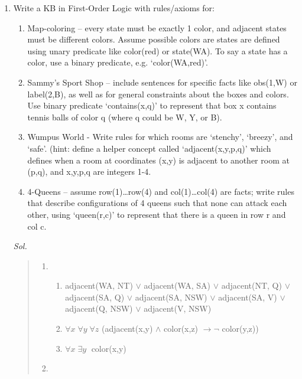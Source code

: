 \documentclass{article}
\theoremstyle{definition}
\newcommand{\<}{\langle}
\renewcommand{\>}{\rangle}
\begin{document}
\begin{enumerate}[label=\textbf{\arabic*.}]
\begin{quote}
\end{quote}
\newpage
\item Write a KB in First-Order Logic with rules/axioms for:
  \begin{enumerate}
    \item Map-coloring – every state must be exactly 1 color, and adjacent states must be different
colors. Assume possible colors are states are defined using unary predicate like color(red)
or state(WA). To say a state has a color, use a binary predicate, e.g. ‘color(WA,red)’.
    \item Sammy’s Sport Shop – include sentences for specific facts like obs(1,W) or label(2,B),
as well as for general constraints about the boxes and colors. Use binary predicate
‘contains(x,q)’ to represent that box x contains tennis balls of color q (where q could be
W, Y, or B).
    \item Wumpus World - Write rules for which rooms are ‘stenchy’, ‘breezy’, and ‘safe’. (hint:
define a helper concept called ‘adjacent(x,y,p,q)’ which defines when a room at
coordinates (x,y) is adjacent to another room at (p,q), and x,y,p,q are integers 1-4.
    \item 4-Queens – assume row(1)…row(4) and col(1)…col(4) are facts; write rules that
describe configurations of 4 queens such that none can attack each other, using
‘queen(r,c)’ to represent that there is a queen in row r and col c.
  \end{enumerate}

  \vspace{1em} 
  \textit{ Sol. }
  \begin{quote}
  \begin{enumerate}
    \item 

      \begin{enumerate}
        \item adjacent(WA, NT) $\lor$ adjacent(WA, SA) $\lor$ adjacent(NT, Q) $\lor$ adjacent(SA, Q) $\lor$ adjacent(SA, NSW)  $\lor$ adjacent(SA, V) $\lor$ adjacent(Q, NSW) $\lor$ adjacent(V, NSW)
        \item $\forall x \; \forall y \; \forall z$ (adjacent(x,y) $\land$ color(x,z) $\rightarrow \lnot$ color(y,z))
        \item $\forall x \; \exists y \;$ color(x,y)
      \end{enumerate}
      \vspace{0.5em}
    \item


\end{enumerate}
\end{quote}
\end{enumerate}
\end{document}
